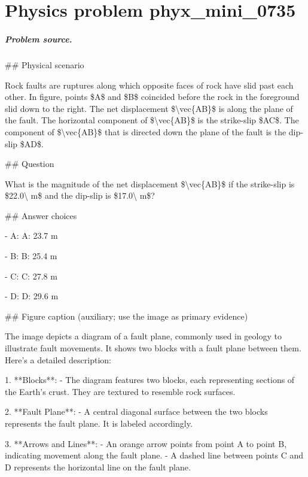 
\chapter{Physics problem phyx\_mini\_0735}
\label{ch:PhyXMiniProblems_problem_phyx_mini_0735}

\paragraph{Problem source.}
\#\# Physical scenario

Rock faults are ruptures along which opposite faces of rock have slid past each other. In figure, points \$A\$ and \$B\$ coincided before the rock in the foreground slid down to the right. The net displacement \$\textbackslash{}vec\{AB\}\$ is along the plane of the fault. The horizontal component of \$\textbackslash{}vec\{AB\}\$ is the strike-slip \$AC\$. The component of \$\textbackslash{}vec\{AB\}\$ that is directed down the plane of the fault is the dip-slip \$AD\$.

\#\# Question

What is the magnitude of the net displacement \$\textbackslash{}vec\{AB\}\$ if the strike-slip is \$22.0\textbackslash{} m\$ and the dip-slip is \$17.0\textbackslash{} m\$?

\#\# Answer choices

- A: A: 23.7 m

- B: B: 25.4 m

- C: C: 27.8 m

- D: D: 29.6 m

\#\# Figure caption (auxiliary; use the image as primary evidence)

The image depicts a diagram of a fault plane, commonly used in geology to illustrate fault movements. It shows two blocks with a fault plane between them. Here's a detailed description:

1. **Blocks**: 
   - The diagram features two blocks, each representing sections of the Earth's crust. They are textured to resemble rock surfaces.
   
2. **Fault Plane**: 
   - A central diagonal surface between the two blocks represents the fault plane. It is labeled accordingly.

3. **Arrows and Lines**: 
   - An orange arrow points from point A to point B, indicating movement along the fault plane.
   - A dashed line between points C and D represents the horizontal line on the fault plane.

